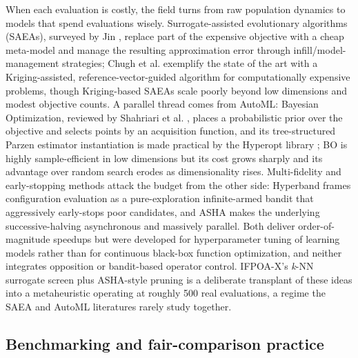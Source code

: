 \documentclass[preprint,12pt]{elsarticle}
\begin{document}
When each evaluation is costly, the field turns from raw population dynamics to models that spend evaluations wisely. Surrogate-assisted evolutionary algorithms (SAEAs), surveyed by Jin \cite{jin2011surrogate}, replace part of the expensive objective with a cheap meta-model and manage the resulting approximation error through infill/model-management strategies; Chugh et al. \cite{chugh2018surrogate} exemplify the state of the art with a Kriging-assisted, reference-vector-guided algorithm for computationally expensive problems, though Kriging-based SAEAs scale poorly beyond low dimensions and modest objective counts. A parallel thread comes from AutoML: Bayesian Optimization, reviewed by Shahriari et al. \cite{shahriari2016taking}, places a probabilistic prior over the objective and selects points by an acquisition function, and its tree-structured Parzen estimator instantiation is made practical by the Hyperopt library \cite{bergstra2013hyperopt}; BO is highly sample-efficient in low dimensions but its cost grows sharply and its advantage over random search erodes as dimensionality rises. Multi-fidelity and early-stopping methods attack the budget from the other side: Hyperband \cite{li2018hyperband} frames configuration evaluation as a pure-exploration infinite-armed bandit that aggressively early-stops poor candidates, and ASHA \cite{li2020asha} makes the underlying successive-halving asynchronous and massively parallel. Both deliver order-of-magnitude speedups but were developed for hyperparameter tuning of learning models rather than for continuous black-box function optimization, and neither integrates opposition or bandit-based operator control. IFPOA-X's \emph{k}-NN surrogate screen plus ASHA-style pruning is a deliberate transplant of these ideas into a metaheuristic operating at roughly 500 real evaluations, a regime the SAEA and AutoML literatures rarely study together.

\subsection{Benchmarking and fair-comparison practice}
\label{subsec2-5}
\end{document}

